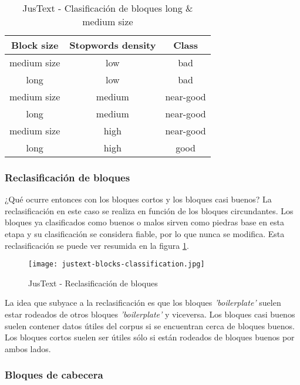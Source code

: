 \begin{table}[h]
  \begin{center}
  \begin{tabular}{| c | c | c |}
  \hline \textbf{Block size} & \textbf{Stopwords density} & \textbf{Class} \\ \hline
  medium size & low & bad \\ \hline
  long & low & bad \\ \hline
  medium size & medium & near-good \\ \hline
  long & medium & near-good \\ \hline
  medium size & high & near-good \\ \hline
  long & high & good \\ \hline
  \end{tabular}
  \caption{JusText - Clasificación de bloques long \& medium size}
  \label{tab:justext - clasificacion de bloques long & medium size}
  \end{center}
\end{table}

\subsubsection{Reclasificación de bloques}
\label{subsubsec:reclasificacion de bloques}

¿Qué ocurre entonces con los bloques cortos y los bloques casi buenos? La reclasificación en este caso se 
realiza en función de los bloques circundantes. Los bloques ya clasificados como buenos o malos sirven 
como piedras base en esta etapa y su clasificación se considera fiable, por lo que nunca se modifica. Esta 
reclasificación se puede ver resumida en la figura \ref{img:justext - reclasificacion de bloques}.

\begin{figure}[tphb]
  \centering
  \texttt{[image: justext-blocks-classification.jpg]}
  \caption{JusText - Reclasificación de bloques}
  \label{img:justext - reclasificacion de bloques}
\end{figure}

La idea que subyace a la reclasificación es que los bloques \emph{'boilerplate'} suelen estar rodeados de 
otros bloques \emph{'boilerplate'} y viceversa. Los bloques casi buenos suelen contener datos útiles del 
corpus si se encuentran cerca de bloques buenos. Los bloques cortos suelen ser útiles sólo si están rodeados 
de bloques buenos por ambos lados.

\subsubsection{Bloques de cabecera}
\label{subsubsec:bloques de cabecera}

